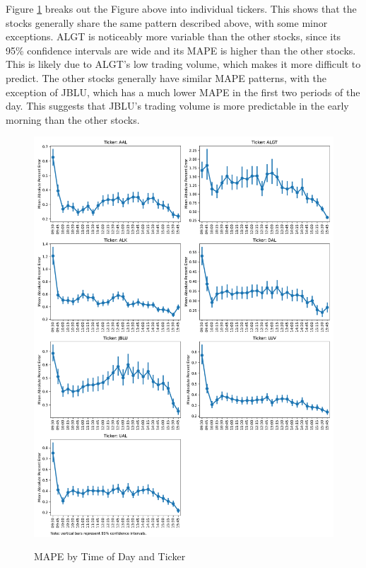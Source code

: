 \documentclass[12pt]{article}
\begin{document}
Figure \ref{fig:mape_by_time_by_ticker} breaks out the Figure above into individual tickers. This shows that the stocks generally share the same pattern described above, with some minor exceptions. ALGT is noticeably more variable than the other stocks, since its 95\% confidence intervals are wide and its MAPE is higher than the other stocks. This is likely due to ALGT's low trading volume, which makes it more difficult to predict. The other stocks generally have similar MAPE patterns, with the exception of JBLU, which has a much lower MAPE in the first two periods of the day. This suggests that JBLU's trading volume is more predictable in the early morning than the other stocks.
\begin{figure}[H]
    \centering
    \caption{MAPE by Time of Day and Ticker}
    \includegraphics[width=0.75\linewidth]{../Output/mape_by_time_by_ticker.pdf}
    \label{fig:mape_by_time_by_ticker}
\end{figure}
\end{document}
